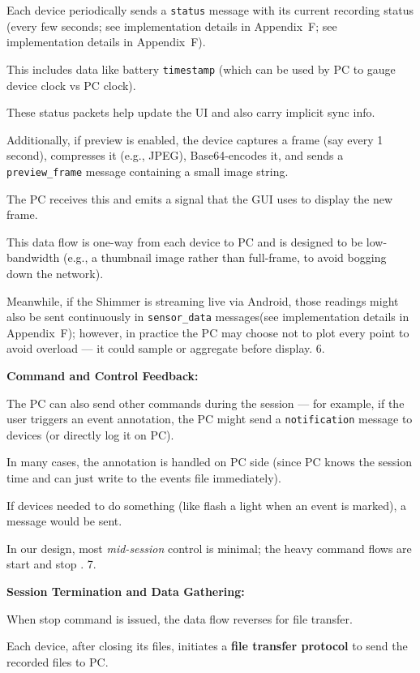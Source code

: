 Each device periodically sends a \texttt{status} message with its current
recording status (every few seconds; see implementation details in Appendix~F;
see implementation details in Appendix~F).

This includes data like battery %
\texttt{timestamp} (which can be used by PC to gauge device clock vs PC clock).

These status packets help update the UI and also carry implicit sync info.

Additionally, if preview is enabled, the device captures a frame (say every 1
second), compresses it (e.g., JPEG), Base64-encodes it, and sends a
\texttt{preview\_frame} message containing a small image string.

The PC receives this and emits a signal that the GUI uses to display the new
frame.

This data flow is one-way from each device to PC and is designed to be
low-bandwidth (e.g., a thumbnail image rather than full-frame, to avoid bogging
down the network).

Meanwhile, if the Shimmer is streaming live via Android, those readings might
also be sent continuously in \texttt{sensor\_data} messages(see implementation
details in Appendix~F); however, in practice the PC may choose not to plot every
point to avoid overload --- it could sample or aggregate before display. 6.

\textbf{Command and Control Feedback:}

The PC can also send other commands during the session --- for example, if the
user triggers an event annotation, the PC might send a \texttt{notification}
message to devices (or directly log it on PC).

In many cases, the annotation is handled on PC side (since PC knows the session
time and can just write to the events file immediately).

If devices needed to do something (like flash a light when an event is marked),
a message would be sent.

In our design, most \textit{mid-session} control is minimal; the heavy command flows are start and stop
. 7.

\textbf{Session Termination and Data Gathering:}

When stop command is issued, the data flow reverses for file transfer.

Each device, after closing its files, initiates a \textbf{file transfer protocol}
 to send the recorded files to PC.

